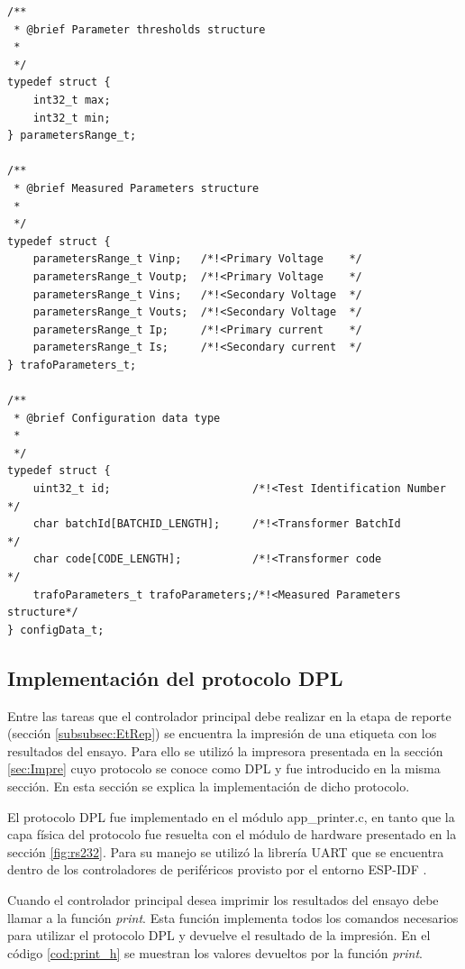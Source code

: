 \begin{lstlisting}[label=cod:struct_http,caption=Estructuras para el manejo de los datos recibidos.]
/**
 * @brief Parameter thresholds structure
 *
 */
typedef struct {
	int32_t max;
	int32_t min;
} parametersRange_t;

/**
 * @brief Measured Parameters structure
 *
 */
typedef struct {
	parametersRange_t Vinp;   /*!<Primary Voltage    */
	parametersRange_t Voutp;  /*!<Primary Voltage    */
	parametersRange_t Vins;   /*!<Secondary Voltage  */
	parametersRange_t Vouts;  /*!<Secondary Voltage  */
	parametersRange_t Ip;     /*!<Primary current    */
	parametersRange_t Is;     /*!<Secondary current  */
} trafoParameters_t;

/**
 * @brief Configuration data type
 *
 */
typedef struct {
	uint32_t id;                      /*!<Test Identification Number   */
	char batchId[BATCHID_LENGTH];     /*!<Transformer BatchId          */
	char code[CODE_LENGTH];           /*!<Transformer code             */
	trafoParameters_t trafoParameters;/*!<Measured Parameters structure*/
} configData_t;
\end{lstlisting}


\subsection{Implementación del protocolo DPL}

Entre las tareas que el controlador principal debe realizar en la etapa de reporte (sección \ref{subsubsec:EtRep}) se encuentra la impresión de una etiqueta con los resultados del ensayo. Para ello se utilizó la impresora presentada en la sección \ref{sec:Impre} cuyo protocolo se conoce como DPL y fue introducido en la misma sección. En esta sección se explica la implementación de dicho protocolo.

El protocolo DPL fue implementado en el módulo app\_printer.c, en tanto que la capa física del protocolo fue resuelta con el módulo de hardware presentado en la sección \ref{fig:rs232}. Para su manejo se utilizó la librería UART que se encuentra dentro de los controladores de periféricos provisto por el entorno ESP-IDF \citep{ESPIDF:PER}.

Cuando el controlador principal desea imprimir los resultados del ensayo debe llamar a la función \textit{print}. Esta función implementa todos los comandos necesarios para utilizar el protocolo DPL y devuelve el resultado de la impresión. En el código \ref{cod:print_h} se muestran los valores devueltos por la función \textit{print}.

